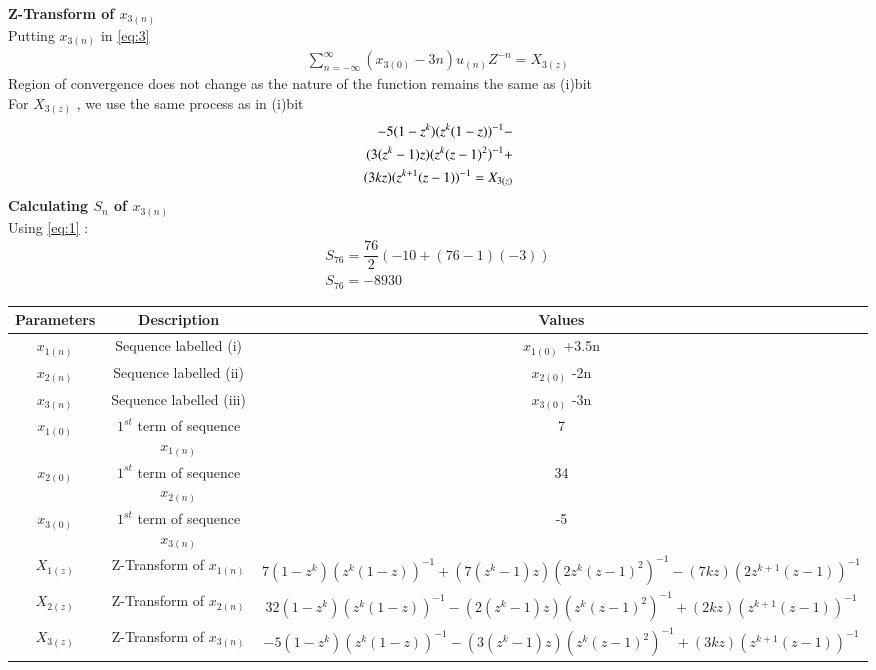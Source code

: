 \documentclass[journal,12pt,twocolumn]{IEEEtran}
\theoremstyle{remark}
\begin{document}
\begin{enumerate}
\textbf{Z-Transform of $x_{3(n)}$}\\
Putting $x_{3(n)}$ in \eqref{eq:3}\\
\begin{align}
\sum_{n=-\infty}^{\infty}(x_{3(0)} -3n)u_{(n)}Z^{-n} =X_{3(z)}
\end{align}
Region of convergence does not change as the nature of the function remains the same as (i)bit\\
For $X_{3(z)}$ , we use the same process as in (i)bit\\
\begin{align}
   \notag -5(1-z^k)(z^k(1-z))^{-1}-
   \\ \notag(3(z^k-1)z)(z^k(z-1)^2)^{-1}+\\ (3kz)(z^{k+1}(z-1))^{-1}=X_{3(z)}
\end{align}
\textbf{Calculating $S_n$ of $x_{3(n)}$}\\
Using \eqref{eq:1} :\\
\begin{align}
    S_{76}=\dfrac{76}{2}(-10+(76-1)(-3))
   \\S_{76}=-8930
    \end{align}
  
 \newpage
 \begin{center}
\begin{tabular}{ |c|c|c| } 
 \hline
 Parameters & Description & Values    \\ 
 \hline
  $x_{1(n)}$ & Sequence labelled (i) &  $x_{1(0)}$ +3.5n\\
  $x_{2(n)}$ &  Sequence labelled (ii) & $x_{2(0)}$ -2n \\
  $x_{3(n)}$ &  Sequence labelled (iii) & $x_{3(0)}$ -3n \\
   $x_{1(0)}$ & $1^{st}$ term of sequence $x_{1(n)}$ & 7 \\
     $x_{2(0)}$ & $1^{st}$ term of sequence $x_{2(n)}$& 34 \\
     $x_{3(0)}$ & $1^{st}$ term of sequence $x_{3(n)}$ & -5 \\
 $X_{1(z)}$ & Z-Transform of $x_{1(n)}$ & $7(1-z^k)(z^k(1-z))^{-1}+
    (7(z^k-1)z)(2z^k(z-1)^2)^{-1}-(7kz)(2z^{k+1}(z-1))^{-1}$\\
 $X_{2(z)}$ &  Z-Transform of $x_{2(n)}$ & $32(1-z^k)(z^k(1-z))^{-1}-
    (2(z^k-1)z)(z^k(z-1)^2)^{-1}+(2kz)(z^{k+1}(z-1))^{-1}$ \\ 
$X_{3(z)}$ &  Z-Transform of $x_{3(n)}$ & $-5(1-z^k)(z^k(1-z))^{-1}-
    (3(z^k-1)z)(z^k(z-1)^2)^{-1}+(3kz)(z^{k+1}(z-1))^{-1}$ \\
 \hline
\end{tabular}
\centering
\captionsetup{TABLE 1 : PARAMETERS , DESCRIPTIONS AND VALUES }
\end{center}
\end{enumerate}
\end{document}

